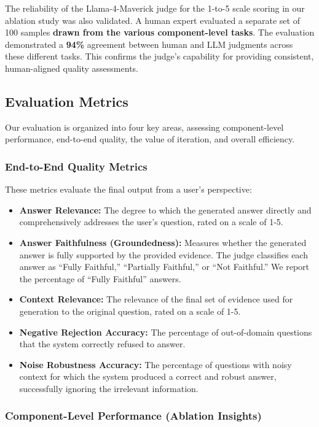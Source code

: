 \documentclass[11pt]{article}
\begin{document}
The reliability of the Llama-4-Maverick judge for the 1-to-5 scale scoring in our ablation study was also validated. A human expert evaluated a separate set of 100 samples \textbf{drawn from the various component-level tasks}. The evaluation demonstrated a \textbf{94\%} agreement between human and LLM judgments across these different tasks. This confirms the judge's capability for providing consistent, human-aligned quality assessments.

\subsection{Evaluation Metrics}

Our evaluation is organized into four key areas, assessing component-level performance, end-to-end quality, the value of iteration, and overall efficiency.

\subsubsection{End-to-End Quality Metrics}

These metrics evaluate the final output from a user's perspective:

\begin{itemize}
    \item \textbf{Answer Relevance:} The degree to which the generated answer directly and comprehensively addresses the user's question, rated on a scale of 1-5.
    \item \textbf{Answer Faithfulness (Groundedness):} Measures whether the generated answer is fully supported by the provided evidence. The judge classifies each answer as ``Fully Faithful,'' ``Partially Faithful,'' or ``Not Faithful.'' We report the percentage of ``Fully Faithful'' answers.
    \item \textbf{Context Relevance:} The relevance of the final set of evidence used for generation to the original question, rated on a scale of 1-5.
    \item \textbf{Negative Rejection Accuracy:} The percentage of out-of-domain questions that the system correctly refused to answer.
    \item \textbf{Noise Robustness Accuracy:} The percentage of questions with noisy context for which the system produced a correct and robust answer, successfully ignoring the irrelevant information.
\end{itemize}

\subsubsection{Component-Level Performance (Ablation Insights)}
\end{document}

